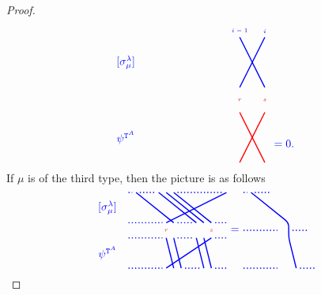 \documentclass[twoside,11pt,reqno,letter]{amsart}
\numberwithin{equation}{section}
\theoremstyle{definition}  %
\newcommand{\0}{{\bar 0}}
\newcommand{\1}{{\bar 1}}
\newcommand{\la}{\lambda}
\newcommand{\si}{\sigma}
\def\T{{\mathtt T}}
\newenvironment{braid}{%
  \begin{tikzpicture}[baseline=6mm,blue,line width=1pt, scale=0.4,
                      draw/.append style={rounded corners},
                      every node/.append style={font=\tiny}]%
  }{\end{tikzpicture}
}
\begin{document}
{\begin{proof}
\[\begin{braid}
    \draw(7,10)node[above]{$i-1$}--(9,6);
      \draw[color=red](9,5)node{$s$};
      \draw[color=red](9,4)--(7,0);
    \draw(9,10)node[above]{$i$}--(7,6);
      \draw[color=red](7,5)node{$r$};
      \draw[color=red](7,4)--(9,0);

    \draw(-1,8)node[left,font=\normalsize]{$[\si^\la_\mu]$};
    \draw(-1,2)node[left,font=\normalsize]{$\psi^{\T^A}$};
  \end{braid}
  \begin{braid}\tikzset{scale=0.6,baseline=12mm}
    \draw(0,5)node[font=\normalsize]{$=0$.};
  \end{braid}
\]
If $\mu$ is of the third type, then the picture is as follows
\[
  \begin{braid}\tikzset{scale=0.6,baseline=12mm}
    \draw[dotted](0,10)--(0.5,10);
    \draw[dotted](0,6)--(4.5,6);
    \draw[dotted](0,4)--(4.5,4);
    \draw[dotted](0,0)--(4.5,0);

    \draw(1,10)--(6,6);
      \draw(6,4)--(7,0);

    \draw[dotted](1.5,10)--(3.5,10);
    \draw[dotted](6.5,6)--(8.5,6);
    \draw[dotted](6.5,4)--(8.5,4);
    \draw[dotted](7.5,0)--(9.5,0);

    \draw(4,10)--(9,6);
      \draw(9,4)--(10,0);
    \draw(5,10)--(10,6);
      \draw(10,4)--(11,0);
    \draw(6,10)--(11,6);
      \draw(11,5)node[color=red]{$s$};
      \draw(11,4)--(5,0);

    \draw[dotted](6.5,10)--(12.5,10);

    \draw(13,10)--(5,6);
      \draw(5,5)node[color=red]{$r$};
      \draw(5,4)--(6,0);

    \draw[dotted](11.5,6)--(13,6);
    \draw[dotted](11.5,4)--(13,4);
    \draw[dotted](11.5,0)--(13,0);

    \draw(-1,8)node[left,font=\normalsize]{$[\si^\la_\mu]$};
    \draw(-1,2)node[left,font=\normalsize]{$\psi^{\T^A}$};
  \end{braid}
  \begin{braid}\tikzset{scale=0.6,baseline=12mm}
    \draw(0,5)node[font=\normalsize]{$=$};
  \end{braid}
  \begin{braid}\tikzset{scale=0.6,baseline=12mm}
    \draw[dotted](0,10)--(0.5,10);
    \draw[dotted](0,5)--(4.5,5);
    \draw[dotted](0,0)--(4.5,0);

    \draw(1,10)--(6,6)--(6,4)--(7,0);

    \draw[dotted](1.5,10)--(3.5,10);
    \draw[dotted](6.5,5)--(8.5,5);
    \draw[dotted](7.5,0)--(9.5,0);


\end{braid}\]
\end{proof}}
\end{document}
